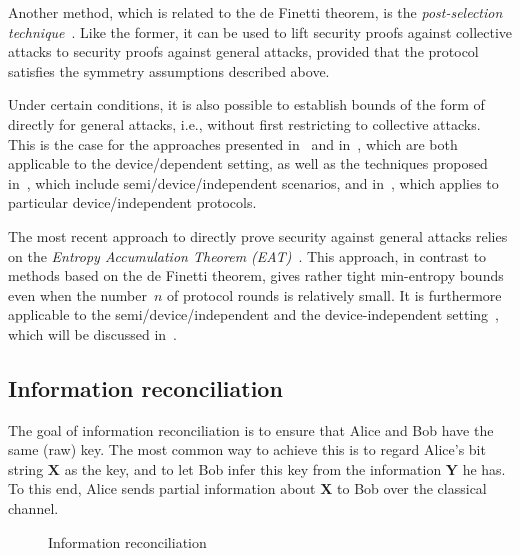 Another method, which is related to the de Finetti theorem, is the  \emph{post-selection technique}~\cite{CKR09}. Like the former, it can be used to lift security proofs against collective attacks to security proofs against general attacks, provided that the protocol satisfies the symmetry assumptions described above. 

Under certain conditions, it is also possible to establish bounds of the form of  directly for general attacks, i.e., without first restricting to collective attacks. This is the case for the approaches presented in~\textcite{CRE04} and in~\textcite{RGK05}, which are both applicable to the device\-/dependent setting, as well as the techniques proposed in~\textcite{TR11,TLGR12}, which include semi\-/device\-/independent scenarios, and in~\textcite{RUV13,VV14,MS14}, which applies to particular device\-/independent protocols. 

The most recent approach to directly prove security against general attacks relies on the  \emph{Entropy Accumulation Theorem (EAT)}~\cite{DFR20}. This approach, in contrast to methods based on the de Finetti theorem, gives rather tight min-entropy bounds even when the number~$n$ of protocol rounds is relatively small. It is furthermore applicable to the semi\-/device\-/independent and the device-independent setting~\cite{AFRV19}, which will be discussed in~.

\subsection{Information reconciliation} \label{sec_infrec}

The goal of information reconciliation is to ensure that Alice and Bob have the same (raw) key. The most common way to achieve this is to regard Alice's bit string $\mathbf{X}$ as the key, and to let Bob infer this key from the information $\mathbf{Y}$ he has. To this end, Alice sends partial information about $\mathbf{X}$ to Bob over the classical channel. 

\begin{figure}[h]
\noindent{}
\caption{Information reconciliation \label{fig:InformationReconciliation}}
\end{figure}

